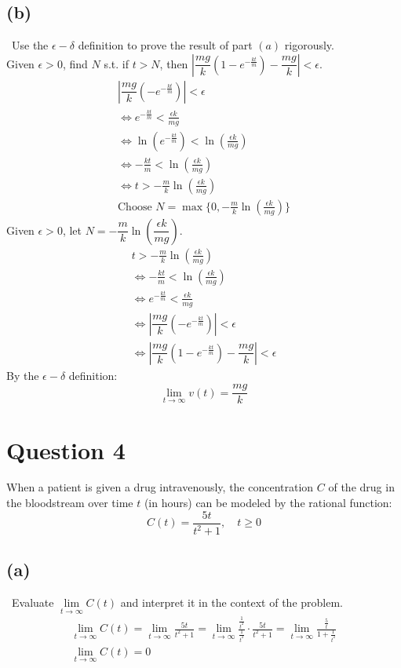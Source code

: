 \documentclass[12pt]{article}
\begin{document}
\subsection{(b)} \, Use the $\epsilon - \delta$ definition to prove the result of part $(a)$ rigorously.\\
Given $\epsilon > 0$, find $N$ s.t. if $t>N$, then $|\dfrac{mg}{k}(1-e^{-\frac{kt}{m}})-\dfrac{mg}{k}|<\epsilon$.
\begin{gather*}
    |\dfrac{mg}{k}(-e^{-\frac{kt}{m}})|<\epsilon\\
    \iff e^{-\frac{kt}{m}}<\frac{\epsilon k}{mg}\\
    \iff \ln(e^{-\frac{kt}{m}})<\ln(\frac{\epsilon k}{mg})\\
    \iff -\frac{kt}{m}<\ln(\frac{\epsilon k}{mg})\\
    \iff t>-\frac{m}{k}\ln(\frac{\epsilon k}{mg})\\
    \boxed{\text{Choose } N = \max \{ 0, -\frac{m}{k}\ln(\frac{\epsilon k}{mg}) \} } 
\end{gather*}
Given $\epsilon>0$, let $N=-\dfrac{m}{k}\ln(\dfrac{\epsilon k}{mg}).$
\begin{gather*}
    t>-\frac{m}{k}\ln(\frac{\epsilon k}{mg})\\
    \iff -\frac{kt}{m}<\ln(\frac{\epsilon k}{mg})\\
    \iff e^{-\frac{kt}{m}}<\frac{\epsilon k}{mg}\\
    \iff |\dfrac{mg}{k}(-e^{-\frac{kt}{m}})|<\epsilon\\
    \iff |\dfrac{mg}{k}(1-e^{-\frac{kt}{m}})-\dfrac{mg}{k}|<\epsilon
\end{gather*}
By the $\epsilon - \delta$ definition:
\[
\boxed{\lim\limits_{t \to \infty}v(t)=\frac{mg}{k}}
\]

\section{Question 4}
When a patient is given a drug intravenously, the concentration $C$ of the drug in the bloodstream over
time $t$ (in hours) can be modeled by the rational function:
\[
C(t)=\frac{5t}{t^2+1}, \quad t\ge 0
\]

\subsection{(a)}\, Evaluate $\lim\limits_{t \to \infty}C(t)$ and interpret it in the context of the problem.
\begin{gather*}
    \lim_{t \to \infty}C(t)=\lim_{t \to \infty}\frac{5t}{t^2+1}=\lim_{t \to \infty}\frac{\frac{1}{t^2}}{\frac{1}{t^2}}\cdot \frac{5t}{t^2+1}=\lim_{t \to \infty} \frac{\frac{5}{t}}{1+\frac{1}{t^2}}\\
    \boxed{\lim_{t \to \infty}C(t)=0}
\end{gather*}
\end{document}
